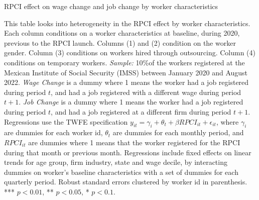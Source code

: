 \documentclass[oneside,11pt]{article}
\begin{document}
\begin{table}[H]
    \caption{RPCI effect on wage change and job change by worker characteristics}
    \label{twfe_change_hetero_wrk_char}
    \begin{center}
    \scriptsize{}
    \end{center}
\end{table}
\scriptsize{
\noindent This table looks into heterogeneity in the RPCI effect by worker characteristics. Each column conditions on a worker characteristics at baseline, during 2020, previous to the RPCI launch. Columns (1) and (2) condition on the worker gender. Column (3) conditions on workers hired through outsourcing. Column (4) conditions on temporary workers. \textit{Sample:} 10\%of the workers registered at the Mexican Institute of Social Security (IMSS) between January 2020 and August 2022. \textit{Wage Change} is a dummy where 1 means the worker had a job registered during period $t$, and had a job registered with a different wage during period $t+1$. \textit{Job Change} is a dummy where 1 means the worker had a job registered during period $t$, and had a job registered at a different firm during period $t+1$. Regressions use the TWFE specification $y_{it} = \gamma_{i} + \theta_{t}+ \beta RPCI_{it} +\epsilon_{it}$, where $\gamma_{i}$ are dummies for each worker id, $\theta_{t}$ are dummies for each monthly period, and $RPCI_{it}$ are dummies where 1 means that the worker registered for the RPCI during that month or previous month. Regressions include fixed effects on linear trends for age group, firm industry, state and wage decile, by interacting dummies on worker's baseline characteristics with a set of dummies for each quarterly period. Robust standard errors clustered by worker id in parenthesis. *** $p<0.01$, ** $p<0.05$, * $p<0.1$.
}

\clearpage
\end{document}
